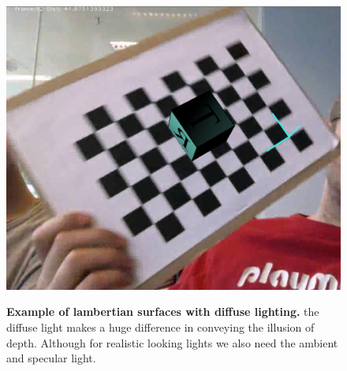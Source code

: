 \begin{figure}[H]
    \includegraphics{pics/phongDiffuseOnly.png}
    \label{fig:EphongDiffuseOnly}
    \caption{\textbf{Example of lambertian surfaces with diffuse lighting.} 
    the diffuse light makes a huge difference in conveying the illusion of depth. Although for realistic looking lights we also need the ambient and specular light. }
\end{figure}
